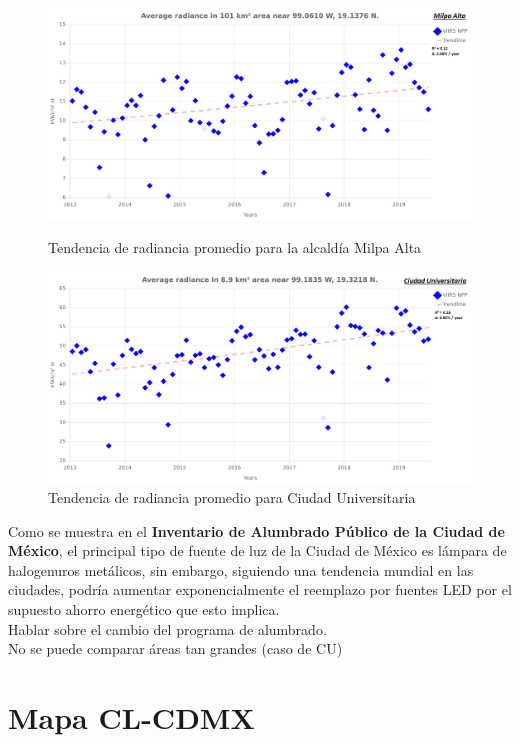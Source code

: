 \begin{figure}[H]
  \centering
    \includegraphics[width=1\textwidth]{MA}
  \caption{Tendencia de radiancia promedio para la alcaldía Milpa Alta}
  \label{radiancetrendsma}
\vspace{20mm} 
    \includegraphics[width=1\textwidth]{CU}
  \caption{Tendencia de radiancia promedio para Ciudad Universitaria}
  \label{radiancetrendscu}
\end{figure}
\blindtext


\newpage

Como se muestra en el \textbf{Inventario de Alumbrado Público de la Ciudad de México}, el principal tipo de fuente de luz de la Ciudad de México es lámpara de halogenuros metálicos, sin embargo, siguiendo una tendencia mundial en las ciudades, podría aumentar exponencialmente el reemplazo por fuentes LED por el supuesto ahorro energético que esto implica.\\

Hablar sobre el cambio del programa de alumbrado.\\

No se puede comparar áreas tan grandes (caso de CU)

\newpage

\section{Mapa CL-CDMX}

